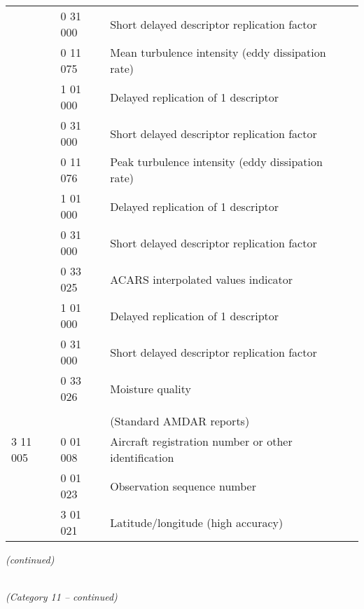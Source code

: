 \begin{longtable}[]{@{}llll@{}}
& 0 31 000 & Short delayed descriptor replication factor &\tabularnewline
& 0 11 075 & Mean turbulence intensity (eddy dissipation rate) &\tabularnewline
& 1 01 000 & Delayed replication of 1 descriptor &\tabularnewline
& 0 31 000 & Short delayed descriptor replication factor &\tabularnewline
& 0 11 076 & Peak turbulence intensity (eddy dissipation rate) &\tabularnewline
& 1 01 000 & Delayed replication of 1 descriptor &\tabularnewline
& 0 31 000 & Short delayed descriptor replication factor &\tabularnewline
& 0 33 025 & ACARS interpolated values indicator &\tabularnewline
& 1 01 000 & Delayed replication of 1 descriptor &\tabularnewline
& 0 31 000 & Short delayed descriptor replication factor &\tabularnewline
& 0 33 026 & Moisture quality &\tabularnewline
& & &\tabularnewline
& & (Standard AMDAR reports) &\tabularnewline
3 11 005 & 0 01 008 & Aircraft registration number or other identification &\tabularnewline
& 0 01 023 & Observation sequence number &\tabularnewline
& 3 01 021 & Latitude/longitude (high accuracy) &\tabularnewline
\bottomrule
\end{longtable}

\emph{(continued)}

\emph{\\
(Category 11 -- continued)}

